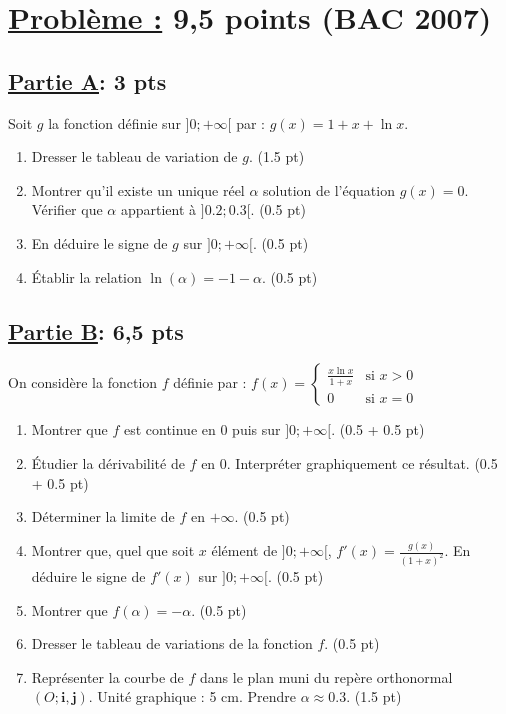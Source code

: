 \documentclass[12pt,a4paper]{article}
\begin{document}
\section*{\underline{Problème :} 9,5 points (BAC 2007)}
\subsection*{\underline{\textbf{Partie A}}:\textbf{ 3 pts}}
Soit $g$ la fonction définie sur $]0 ; +\infty[$ par : 
\(g(x) = 1 + x + \ln x.\)
\begin{enumerate}
    \item Dresser le tableau de variation de $g$. \hfill (1.5 pt)

\item  Montrer qu'il existe un unique réel $\alpha$ solution de l'équation $g(x) = 0$. Vérifier que $\alpha$ appartient à $]0.2 ; 0.3[$. \hfill (0.5 pt)

\item  En déduire le signe de $g$ sur $]0 ; +\infty[$. \hfill (0.5 pt)

\item  Établir la relation $\ln(\alpha) = -1 - \alpha$. \hfill (0.5 pt)
\end{enumerate}
\subsection*{\underline{\textbf{Partie B}}:\textbf{ 6,5 pts}}
On considère la fonction $f$ définie par :
\(f(x) = 
\begin{cases} 
\frac{x \ln x}{1 + x} & \text{si } x > 0 \\
0 & \text{si } x = 0
\end{cases}\)

\begin{enumerate}
    \item Montrer que $f$ est continue en $0$ puis sur $]0 ; +\infty[$. \hfill (0.5 + 0.5 pt)

    \item  Étudier la dérivabilité de $f$ en $0$. Interpréter graphiquement ce résultat. \hfill (0.5 + 0.5 pt)

    \item  Déterminer la limite de $f$ en $+\infty$. \hfill (0.5 pt)

    \item  Montrer que, quel que soit $x$ élément de $]0 ; +\infty[$, 
\(f'(x) = \frac{g(x)}{(1 + x)^2}.\)
En déduire le signe de $f'(x)$ sur $]0 ; +\infty[$. \hfill (0.5 pt)

    \item  Montrer que $f(\alpha) = -\alpha$. \hfill (0.5 pt)

    \item  Dresser le tableau de variations de la fonction $f$. \hfill (0.5 pt)

    \item  Représenter la courbe de $f$ dans le plan muni du repère orthonormal $(O ; \mathbf{i}, \mathbf{j})$. Unité graphique : 5 cm. Prendre $\alpha \approx 0.3$. \hfill (1.5 pt)
\end{enumerate}
\end{document}
